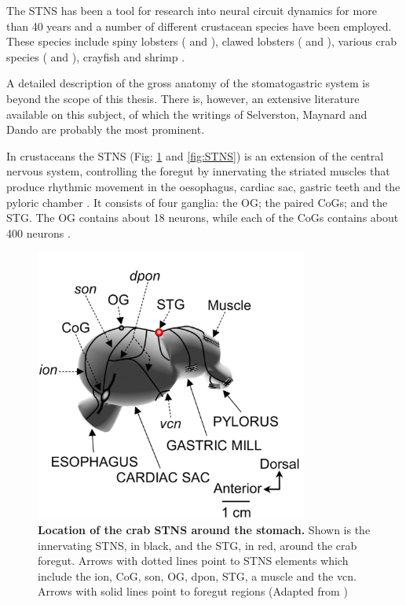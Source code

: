 The \ac{STNS} has been a tool for research into neural circuit dynamics for more than 40 years and a number of different crustacean species have been employed. These species include spiny lobsters ( and ), clawed lobsters ( and ), various crab species ( and ), crayfish and shrimp \cite{Marder2007}.

A detailed description of the gross anatomy of the stomatogastric system is beyond the scope of this thesis. There is, however, an extensive literature available on this subject, of which the writings of Selverston, Maynard and Dando \cite{Selverston1976,Maynard1973} are probably the most prominent.

In crustaceans the \ac{STNS} (Fig: \ref{fig:location_STNS} and \ref{fig:STNS}) is an extension of the central nervous system, controlling the foregut by innervating the striated muscles that produce rhythmic movement in the oesophagus, cardiac sac, gastric teeth and the pyloric chamber \cite{Selverston1987}. It consists of four ganglia: the \ac{OG}; the paired \acp{CoG}; and the \ac{STG}. The \ac{OG} contains about 18 neurons, while each of the \acp{CoG} contains about 400 neurons \cite{Marder2007}.

\begin{figure}[H]
	\centering
		\includegraphics[width=9cm]{graphics/foregut_stns_beenhakker.png}
		\caption[Location of the crab \ac{STNS} around the stomach.]{\textbf{Location of the crab \ac{STNS} around the stomach.} Shown is the innervating \ac{STNS}, in black, and the \ac{STG}, in red, around the crab foregut. Arrows with dotted lines point to \ac{STNS} elements which include the \ac{ion}, \ac{CoG}, \ac{son}, \ac{OG}, \ac{dpon}, \ac{STG}, a muscle and the \ac{vcn}. Arrows with solid lines point to foregut regions (Adapted from \cite{Beenhakker2004})} 
		\label{fig:location_STNS}
\end{figure}


